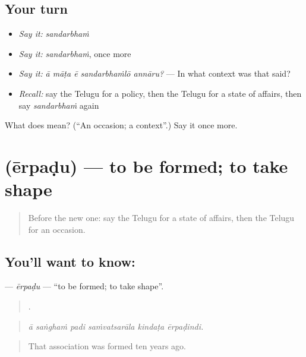 \subsection*{Your turn}
\begin{itemize}
\raggedright
  \item \emph{Say it:} \emph{sandarbhaṁ}
  \item \emph{Say it:} \emph{sandarbhaṁ}, once more
  \item \emph{Say it:} \emph{ā māṭa ē sandarbhaṁlō annāru?} — In what context was that said?
  \item \emph{Recall:} say the Telugu for a policy, then the Telugu for a state of affairs, then say \emph{sandarbhaṁ} again
\end{itemize}

\begin{tcolorbox}[breakable,colback=teal!4,colframe=teal!35!black,title={Before you move on}]
What does  mean? (\textquotedblleft{}An occasion; a context\textquotedblright{}.) Say it once more.
\end{tcolorbox}
\section[\texorpdfstring{\te{ఏర్పడు} (ērpaḍu)}{ఏర్పడు (ērpaḍu)}]{ (ērpaḍu) — to be formed; to take shape}

\label{lesson:TE-C434-erpadu}



\begin{quote}
Before the new one: say the Telugu for a state of affairs, then the Telugu for an occasion.
\end{quote}

\subsection*{You'll want to know: }
\textbf{} — \emph{ērpaḍu} — \textquotedblleft{}to be formed; to take shape\textquotedblright{}.

\begin{quote}
     .
\end{quote}

\begin{quote}
\emph{ā saṅghaṁ padi saṁvatsarāla kindaṭa ērpaḍindi.}
\end{quote}

\begin{quote}
That association was formed ten years ago.
\end{quote}

